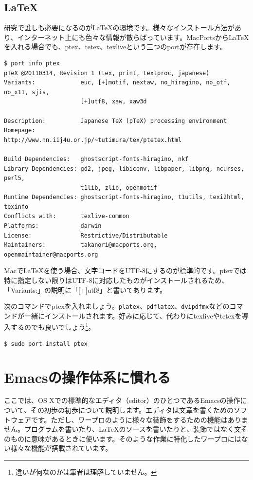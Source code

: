 \subsection{\LaTeX}

研究で誰しも必要になるのが\LaTeX{}の環境です。様々なインストール方法があり、インターネット上にも色々な情報が散らばっています。MacPortsから\LaTeX{}を入れる場合でも、ptex、tetex、texliveという三つのportが存在します。

\begin{lstlisting}
$ port info ptex   
pTeX @20110314, Revision 1 (tex, print, textproc, japanese)
Variants:             euc, [+]motif, nextaw, no_hiragino, no_otf, no_x11, sjis,
                      [+]utf8, xaw, xaw3d

Description:          Japanese TeX (pTeX) processing environment
Homepage:             http://www.nn.iij4u.or.jp/~tutimura/tex/ptetex.html

Build Dependencies:   ghostscript-fonts-hiragino, nkf
Library Dependencies: gd2, jpeg, libiconv, libpaper, libpng, ncurses, perl5,
                      t1lib, zlib, openmotif
Runtime Dependencies: ghostscript-fonts-hiragino, t1utils, texi2html, texinfo
Conflicts with:       texlive-common
Platforms:            darwin
License:              Restrictive/Distributable
Maintainers:          takanori@macports.org, openmaintainer@macports.org
\end{lstlisting}

Macで\LaTeX{}を使う場合、文字コードをUTF-8にするのが標準的です。ptexでは特に指定しない限りはUTF-8に対応したものがインストールされるため、「Variants:」の説明に「[+]utf8」と書いてあります。

次のコマンドでptexを入れましょう。\texttt{platex}、\texttt{pdflatex}、\texttt{dvipdfmx}などのコマンドが一緒にインストールされます。好みに応じて、代わりにtexliveやtetexを導入するのでも良いでしょう\footnote{違いが何なのかは筆者は理解していません。}。

\begin{lstlisting}[language=bash]
$ sudo port install ptex
\end{lstlisting}

\section{Emacsの操作体系に慣れる}
\label{sec_Emacs}

ここでは、OS Xでの標準的なエディタ（editor）のひとつであるEmacsの操作について、その初歩の初歩について説明します。エディタは文章を書くためのソフトウェアです。ただし、ワープロのように様々な装飾をするための機能はありません。プログラムを書いたり、\LaTeX{}のソースを書いたりと、装飾ではなく文そのものに意味があるときに使います。そのような作業に特化したワープロにはない様々な機能が搭載されています。

